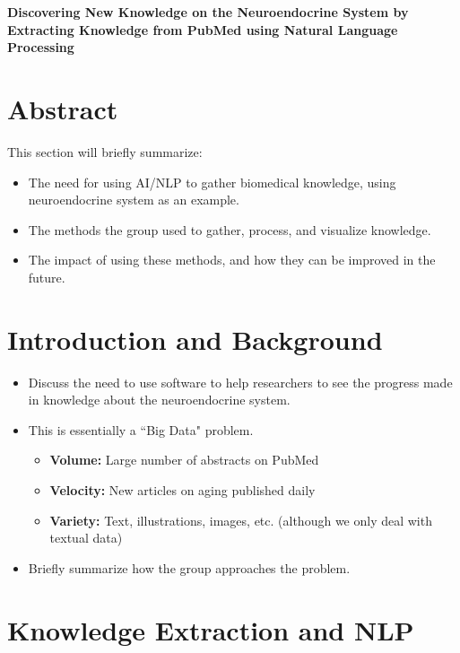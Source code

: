 \documentclass[11pt]{article}
\begin{document}
\begin{center}
  \vspace{3mm}
         {\bf Discovering New Knowledge on the Neuroendocrine System by Extracting Knowledge from PubMed using Natural Language Processing}\\
\end{center}

\section{Abstract}

This section will briefly summarize:

\begin{itemize}
\item The need for using AI/NLP to gather biomedical knowledge, using neuroendocrine system as an example.
\item The methods the group used to gather, process, and visualize knowledge.
\item The impact of using these methods, and how they can be improved in the future.
\end{itemize}

\section{Introduction and Background}

\begin{itemize}
\item Discuss the need to use software to help researchers to see the progress made in knowledge about the neuroendocrine system.
\item This is essentially a ``Big Data" problem.
	\begin{itemize}
		\item \textbf{Volume:} Large number of abstracts on PubMed
		\item \textbf{Velocity:} New articles on aging published daily
		\item \textbf{Variety:} Text, illustrations, images, etc. (although we only deal with textual data) 
	\end{itemize}
\item Briefly summarize how the group approaches the problem.
\end{itemize}

\section{Knowledge Extraction and NLP}
\end{document}
